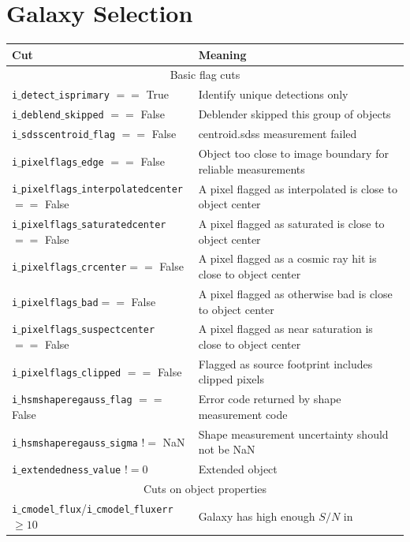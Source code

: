 \documentclass[useamsfonts]{pasj01}
\newcommand{\hmrv}[1]{#1}
\begin{document}
\section*{Galaxy Selection}
\begin{table}
  \begin{tabular}{ll} \hline
    Cut & Meaning \\ \hline
\multicolumn{2}{c}{Basic flag cuts} \\ \hline
\texttt{i$\_$detect$\_$isprimary} $==$ True & Identify unique detections only \\ \hline
\texttt{i$\_$deblend$\_$skipped} $==$ False & Deblender skipped this group of objects \\ \hline
\hmrv{\texttt{i$\_$sdsscentroid$\_$flag} $==$ False} & \hmrv{centroid.sdss measurement failed} \\ \hline
\texttt{i$\_$pixelflags$\_$edge} $==$ False & Object too close to image boundary for reliable measurements \\ \hline
\texttt{i$\_$pixelflags$\_$interpolatedcenter} $==$ False & A pixel flagged as interpolated is
close to object center \\ \hline
\texttt{i$\_$pixelflags$\_$saturatedcenter} $==$ False & A pixel flagged as saturated is
close to object center \\ \hline
\texttt{i$\_$pixelflags$\_$crcenter}$==$ False & A pixel flagged as a cosmic ray hit is
close to object center \\ \hline
\texttt{i$\_$pixelflags$\_$bad}$==$ False & A pixel flagged as otherwise bad is
close to object center \\ \hline
\texttt{i$\_$pixelflags$\_$suspectcenter} $==$ False & A pixel flagged as near saturation is
close to object center \\ \hline
\hmrv{\texttt{i$\_$pixelflags$\_$clipped} $==$ False} & \hmrv{Flagged as source footprint includes clipped pixels} \\ \hline
\texttt{i$\_$hsmshaperegauss$\_$flag} $==$ False & Error code returned by shape measurement
code \\ \hline
\texttt{i$\_$hsmshaperegauss$\_$sigma} $!=$ NaN & Shape measurement uncertainty should not be
  NaN \\ \hline
\texttt{i$\_$extendedness$\_$value} $!= 0$ & Extended object \\ \hline
\multicolumn{2}{c}{Cuts on object properties} \\ \hline
\texttt{i$\_$cmodel$\_$flux}/\texttt{i$\_$cmodel$\_$fluxerr} $\ge 10$ & Galaxy has high enough $S/N$ in

\end{tabular}
\end{table}
\end{document}
